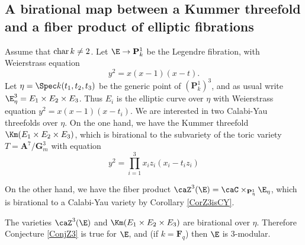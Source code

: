 \documentclass{article}
\def\F{\mathbf{F}}
\DeclareMathOperator{\car}{{\rm char}}
\def\P{\mathbf{P}}
\begin{document}
\subsection{A birational map between a Kummer threefold and a fiber product of elliptic fibrations}

Assume that $\car k\neq 2$.  Let $\E\to\P^1_k$ be the Legendre fibration, with Weierstrass equation
\[ y^2 = x(x-1)(x-t). \]
Let $\eta=\Spec k(t_1,t_2,t_3)$ be the generic point of $(\P^1_k)^3$, and as usual write $\E^3_{\eta}=E_1\times E_2\times E_3$.  Thus $E_i$ is the elliptic curve over $\eta$ with Weierstrass equation $y^2=x(x-1)(x-t_i)$.  We are interested in two Calabi-Yau threefolds over $\eta$.    On the one hand,  we have the Kummer threefold $\Km(E_1\times E_2\times E_3)$, which is birational to the subvariety of the toric variety $T=\mathbf{A}^7/\mathbf{G}_m^3$ with equation
\begin{equation}
\label{EqForKm3fold}
y^2 = \prod_{i=1}^3 x_iz_i(x_i-t_iz_i)
\end{equation}

On the other hand, we have the fiber product $\caZ^3(\E)=\caC\times_{\P^1_{\eta}} \E_{\eta}$, which is birational to a Calabi-Yau variety by Corollary \ref{CorZ3isCY}.  

\begin{thm} \label{ThmLegendreBirational} The varieties $\caZ^3(\E)$ and $\Km(E_1\times E_2\times E_3)$ are birational over $\eta$.  Therefore Conjecture \ref{ConjZ3} is true for $\E$, and (if $k=\F_q$) then $\E$ is 3-modular.
\end{thm}
\end{document}
